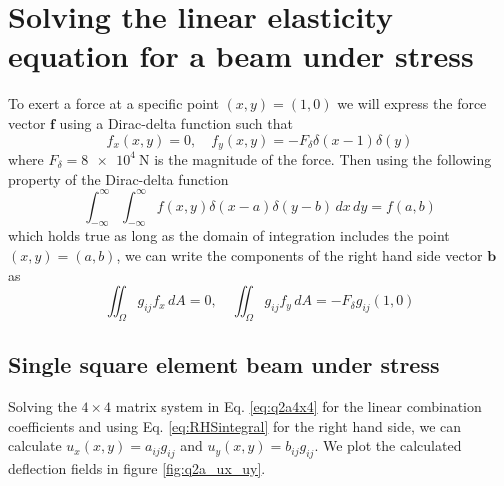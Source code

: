 \documentclass[11pt]{article}
\begin{document}
\section{Solving the linear elasticity equation for a beam under stress}
To exert a force at a specific point $(x,y) = (1,0)$ we will express the force vector $\bm{f}$ using a Dirac-delta function such that
\begin{equation}
  f_x(x,y) = 0, \quad f_y(x,y) = -F_\delta \delta(x-1)\delta(y)
\end{equation}
where $F_\delta = \SI{8e4}{\N}$ is the magnitude of the force. Then using the following property of the Dirac-delta function
\begin{equation}
  \int_{-\infty}^{\infty} \int_{-\infty}^{\infty} f(x,y) \delta(x-a) \delta(y-b) \, dx \, dy = f(a,b)
\end{equation}
which holds true as long as the domain of integration includes the point $(x,y) = (a,b)$, we can write the components of the right hand side vector $\bm{b}$ as
\begin{equation} \label{eq:RHSintegral}
  \iint_\Omega g_{ij} f_x \, dA = 0, \quad 
  \iint_\Omega g_{ij} f_y \, dA = -F_\delta g_{ij}(1,0)
\end{equation}

\subsection{Single square element beam under stress}
Solving the $4\times4$ matrix system in Eq. \eqref{eq:q2a4x4} for the linear combination coefficients and using Eq. \eqref{eq:RHSintegral} for the right hand side, we can calculate $u_x(x,y) = a_{ij}g_{ij}$ and $u_y(x,y) = b_{ij}g_{ij}$. We plot the calculated deflection fields in figure \ref{fig:q2a_ux_uy}.
\end{document}

